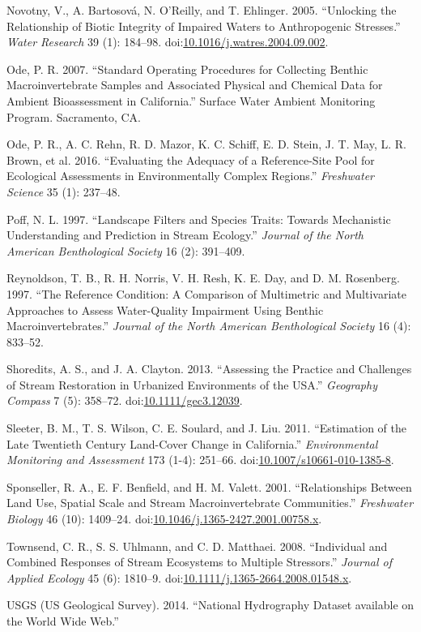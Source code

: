 \documentclass[]{article}
\begin{document}
\hypertarget{ref-Novotny05}{}
Novotny, V., A. Bartosová, N. O'Reilly, and T. Ehlinger. 2005.
``Unlocking the Relationship of Biotic Integrity of Impaired Waters to
Anthropogenic Stresses.'' \emph{Water Research} 39 (1): 184--98.
doi:\href{https://doi.org/10.1016/j.watres.2004.09.002}{10.1016/j.watres.2004.09.002}.

\hypertarget{ref-Ode07}{}
Ode, P. R. 2007. ``Standard Operating Procedures for Collecting Benthic
Macroinvertebrate Samples and Associated Physical and Chemical Data for
Ambient Bioassessment in California.'' Surface Water Ambient Monitoring
Program. Sacramento, CA.

\hypertarget{ref-Ode16}{}
Ode, P. R., A. C. Rehn, R. D. Mazor, K. C. Schiff, E. D. Stein, J. T.
May, L. R. Brown, et al. 2016. ``Evaluating the Adequacy of a
Reference-Site Pool for Ecological Assessments in Environmentally
Complex Regions.'' \emph{Freshwater Science} 35 (1): 237--48.

\hypertarget{ref-Poff97}{}
Poff, N. L. 1997. ``Landscape Filters and Species Traits: Towards
Mechanistic Understanding and Prediction in Stream Ecology.''
\emph{Journal of the North American Benthological Society} 16 (2):
391--409.

\hypertarget{ref-Reynoldson97}{}
Reynoldson, T. B., R. H. Norris, V. H. Resh, K. E. Day, and D. M.
Rosenberg. 1997. ``The Reference Condition: A Comparison of Multimetric
and Multivariate Approaches to Assess Water-Quality Impairment Using
Benthic Macroinvertebrates.'' \emph{Journal of the North American
Benthological Society} 16 (4): 833--52.

\hypertarget{ref-Shoredits13}{}
Shoredits, A. S., and J. A. Clayton. 2013. ``Assessing the Practice and
Challenges of Stream Restoration in Urbanized Environments of the USA.''
\emph{Geography Compass} 7 (5): 358--72.
doi:\href{https://doi.org/10.1111/gec3.12039}{10.1111/gec3.12039}.

\hypertarget{ref-Sleeter11}{}
Sleeter, B. M., T. S. Wilson, C. E. Soulard, and J. Liu. 2011.
``Estimation of the Late Twentieth Century Land-Cover Change in
California.'' \emph{Environmental Monitoring and Assessment} 173 (1-4):
251--66.
doi:\href{https://doi.org/10.1007/s10661-010-1385-8}{10.1007/s10661-010-1385-8}.

\hypertarget{ref-Sponseller01}{}
Sponseller, R. A., E. F. Benfield, and H. M. Valett. 2001.
``Relationships Between Land Use, Spatial Scale and Stream
Macroinvertebrate Communities.'' \emph{Freshwater Biology} 46 (10):
1409--24.
doi:\href{https://doi.org/10.1046/j.1365-2427.2001.00758.x}{10.1046/j.1365-2427.2001.00758.x}.

\hypertarget{ref-Townsend08}{}
Townsend, C. R., S. S. Uhlmann, and C. D. Matthaei. 2008. ``Individual
and Combined Responses of Stream Ecosystems to Multiple Stressors.''
\emph{Journal of Applied Ecology} 45 (6): 1810--9.
doi:\href{https://doi.org/10.1111/j.1365-2664.2008.01548.x}{10.1111/j.1365-2664.2008.01548.x}.

\hypertarget{ref-USGS14}{}
USGS (US Geological Survey). 2014. ``National Hydrography Dataset
available on the World Wide Web.''
\end{document}
